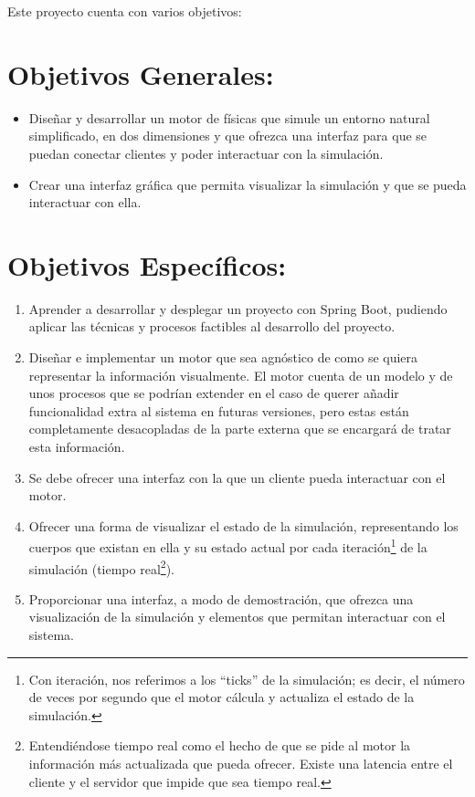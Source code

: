 
Este proyecto cuenta con varios objetivos: 

\section{Objetivos Generales:}

\begin{itemize}
    \item Diseñar y desarrollar un motor de físicas que simule un entorno natural simplificado, en dos dimensiones y que ofrezca una interfaz para que se puedan conectar clientes  y poder interactuar con la simulación.
    \item Crear una interfaz gráfica que permita visualizar la simulación y que se pueda interactuar con ella.
\end{itemize}

 
 \section{Objetivos Específicos:}
 
 
 \begin{enumerate}
     
     \item Aprender a desarrollar y desplegar un proyecto con Spring Boot, pudiendo aplicar las técnicas y procesos factibles al desarrollo del proyecto.
    
     \item Diseñar e implementar un motor que sea agnóstico de como se quiera representar la información visualmente. El motor cuenta de un modelo y de unos procesos que se podrían extender en el caso de querer añadir funcionalidad extra al sistema en futuras versiones, pero estas están completamente desacopladas de la parte externa que se encargará de tratar esta información.

    \item Se debe ofrecer una interfaz con la que un cliente pueda interactuar con el motor.
     
     \item Ofrecer una forma de visualizar el estado de la simulación, representando los cuerpos que existan en ella y su estado actual por cada iteración\footnote{Con iteración, nos referimos a los ``ticks'' de la simulación; es decir, el número de veces por segundo que el motor cálcula y actualiza el estado de la simulación.} de la simulación (tiempo real\footnote{Entendiéndose tiempo real como el hecho de que se pide al motor la información más actualizada que pueda ofrecer. Existe una latencia entre el cliente y el servidor que impide que sea tiempo real. }).
     
     \item Proporcionar una interfaz, a modo de demostración, que ofrezca una visualización de la simulación y elementos que permitan interactuar con el sistema.
     
 \end{enumerate}